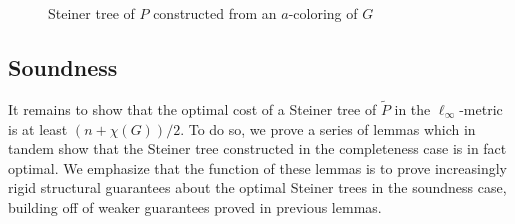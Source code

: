 \documentclass{theoretics}
\newcommand{\1}{\textbf{1}}
\renewcommand{\tilde}{\widetilde}
\begin{document}
\begin{figure}[!ht]






\caption{Steiner tree of $P$ constructed from an $a$-coloring of $G$}
\label{fig: completeness construction}
\end{figure}

\subsection{Soundness}
It remains to show that the optimal cost of a Steiner tree of $\tilde{P}$ in the $\ell_{\infty}$-metric is at least $(n + \chi(G))/2$. To do so, we prove a series of lemmas which in tandem show that the Steiner tree constructed in the completeness case is in fact optimal. We emphasize that the function of these lemmas is to prove increasingly rigid structural guarantees about the optimal Steiner trees in the soundness case, building off of weaker guarantees proved in previous lemmas.
\end{document}
